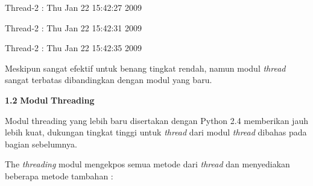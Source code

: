 \noindent 
\begin{center}{\fontsize{10pt}{10pt}\selectfont Thread-2 : Thu Jan 22 15:42:27 2009}\end{center} \par
\noindent 
\begin{center}{\fontsize{10pt}{10pt}\selectfont Thread-2 : Thu Jan 22 15:42:31 2009}\end{center} \par
\noindent 
\begin{center}{\fontsize{10pt}{10pt}\selectfont Thread-2 : Thu Jan 22 15:42:35 2009}\end{center} \par
\vspace{12pt}
Meskipun sangat efektif untuk benang tingkat rendah, namun modul \textit{thread} sangat terbatas dibandingkan dengan modul yang baru. \par
\vspace{12pt}
\textbf{1.2 }\textbf{Modul}\textbf{ Threading } \par
Modul threading yang lebih baru disertakan dengan Python 2.4 memberikan jauh lebih kuat, dukungan tingkat tinggi untuk \textit{thread}\textit{ }dari modul\textit{ }\textit{thread}\textit{ }dibahas pada bagian sebelumnya. \par
The \textit{thread}\textit{ing }modul mengekpos semua metode dari \textit{thread}\textit{ }dan menyediakan beberapa metode tambahan : \par
